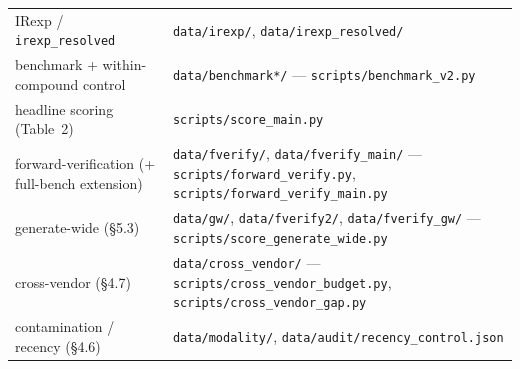 \documentclass[
  10pt,
]{article}
\begin{document}
\begin{table}[htbp]
\begin{tabular}{@{}
  >{\raggedright\arraybackslash}p{}
  >{\raggedright\arraybackslash}p{}@{}}
IRexp / \texttt{irexp\_resolved} & \texttt{data/\hspace{0pt}irexp/},
\texttt{data/\hspace{0pt}irexp\_\hspace{0pt}resolved/} \\
benchmark + within-compound control &
\texttt{data/\hspace{0pt}benchmark*/} ---
\texttt{scripts/\hspace{0pt}benchmark\_\hspace{0pt}v2.py} \\
headline scoring (Table~2) &
\texttt{scripts/\hspace{0pt}score\_\hspace{0pt}main.py} \\
forward-verification (+ full-bench extension) &
\texttt{data/\hspace{0pt}fverify/},
\texttt{data/\hspace{0pt}fverify\_main/} ---
\texttt{scripts/\hspace{0pt}forward\_\hspace{0pt}verify.py},
\texttt{scripts/\hspace{0pt}forward\_\hspace{0pt}verify\_\hspace{0pt}main.py} \\
generate-wide (§5.3) & \texttt{data/\hspace{0pt}gw/},
\texttt{data/\hspace{0pt}fverify2/},
\texttt{data/\hspace{0pt}fverify\_gw/} ---
\texttt{scripts/\hspace{0pt}score\_\hspace{0pt}generate\_\hspace{0pt}wide.py} \\
cross-vendor (§4.7) & \texttt{data/\hspace{0pt}cross\_vendor/} ---
\texttt{scripts/\hspace{0pt}cross\_\hspace{0pt}vendor\_\hspace{0pt}budget.py},
\texttt{scripts/\hspace{0pt}cross\_\hspace{0pt}vendor\_\hspace{0pt}gap.py} \\
contamination / recency (§4.6) & \texttt{data/\hspace{0pt}modality/},
\texttt{data/\hspace{0pt}audit/\hspace{0pt}recency\_\hspace{0pt}control.json}

\end{tabular}
\end{table}
\end{document}
